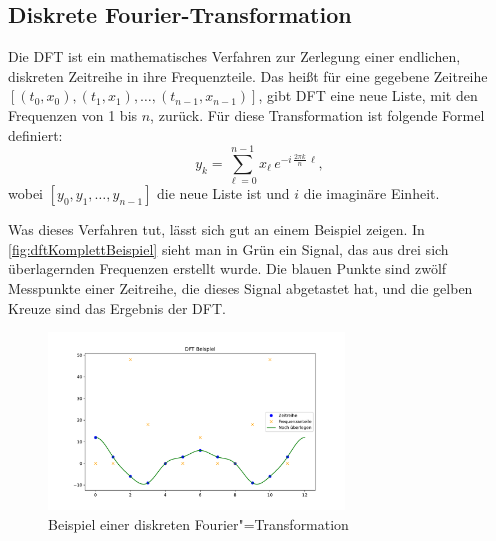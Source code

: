 \subsection{Diskrete Fourier-Transformation}
Die \ac{DFT} ist ein mathematisches Verfahren zur Zerlegung einer endlichen, diskreten Zeitreihe in ihre Frequenzteile. Das heißt für eine gegebene Zeitreihe $[(t_0,x_0),(t_1,x_1),\ldots,(t_{n-1},x_{n-1})]$, gibt \acs{DFT} eine neue Liste, mit den Frequenzen von 1 bis $n$, zurück. Für diese Transformation ist folgende Formel definiert:
\[y_k=\sum_{\ell=0}^{n-1}x_\ell\,e^{-i\,\tfrac{2\pi k}{n}\,\ell},\]
wobei $[y_0,y_1,\ldots,y_{n-1}]$ die neue Liste ist und $i$ die imaginäre Einheit.

Was dieses Verfahren tut, lässt sich gut an einem Beispiel zeigen. In \autoref{fig:dftKomplettBeispiel} sieht man in Grün ein Signal, das aus drei sich überlagernden Frequenzen erstellt wurde. Die blauen Punkte sind zwölf Messpunkte einer Zeitreihe, die dieses Signal abgetastet hat, und die gelben Kreuze sind das Ergebnis der \acs{DFT}. 
\begin{figure}[bth] 
  \centering
  \includegraphics[width=0.7\textwidth]{Graphics/DFTExample1.pdf}
  \caption{Beispiel einer diskreten Fourier"=Transformation}
  \label{fig:dftKomplettBeispiel}
\end{figure}


